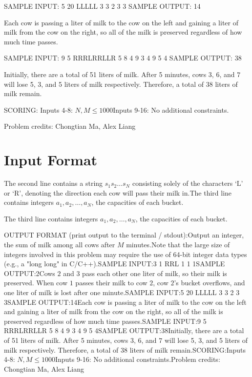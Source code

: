 \documentclass[12pt]{article}
\begin{document}
SAMPLE INPUT:
5 20
LLLLL
3 3 2 3 3
SAMPLE OUTPUT: 
14

Each cow is passing a liter of milk to the cow on the left and gaining a liter
of milk from the cow on the right, so all of the milk is preserved regardless of
how much time passes.

SAMPLE INPUT:
9 5
RRRLRRLLR
5 8 4 9 3 4 9 5 4
SAMPLE OUTPUT: 
38

Initially, there are a total of 51 liters of milk. After 5 minutes, cows $3$, $6$, and $7$ will lose 5, 3, and 5 liters of milk respectively. Therefore, a total of 38 liters of milk remain.

SCORING:
Inputs 4-8: $N,M \le 1000$Inputs 9-16: No additional
constraints.


Problem credits: Chongtian Ma, Alex Liang



\section*{Input Format}
The second line contains a string $s_1s_2\dots s_N$ consisting solely of the
characters $\text{‘L’}$ or $\text{‘R’}$, denoting the direction each cow
will pass their milk in.The third line contains integers $a_1, a_2, \dots, a_N$, the capacities of each
bucket.

The third line contains integers $a_1, a_2, \dots, a_N$, the capacities of each
bucket.

OUTPUT FORMAT (print output to the terminal / stdout):Output an integer, the sum of milk among all cows after $M$ minutes.Note that the large size of integers involved in this problem may require the
use of 64-bit integer data types (e.g., a "long long" in C/C++).SAMPLE INPUT:3 1
RRL
1 1 1SAMPLE OUTPUT:2Cows $2$ and $3$ pass each other one liter of milk, so their milk is preserved.
When cow $1$ passes their milk to cow $2$, cow $2$'s bucket overflows, and one
liter of milk is lost after one minute.SAMPLE INPUT:5 20
LLLLL
3 3 2 3 3SAMPLE OUTPUT:14Each cow is passing a liter of milk to the cow on the left and gaining a liter
of milk from the cow on the right, so all of the milk is preserved regardless of
how much time passes.SAMPLE INPUT:9 5
RRRLRRLLR
5 8 4 9 3 4 9 5 4SAMPLE OUTPUT:38Initially, there are a total of 51 liters of milk. After 5 minutes, cows $3$, $6$, and $7$ will lose 5, 3, and 5 liters of milk respectively. Therefore, a total of 38 liters of milk remain.SCORING:Inputs 4-8: $N,M \le 1000$Inputs 9-16: No additional
constraints.Problem credits: Chongtian Ma, Alex Liang
\end{document}
